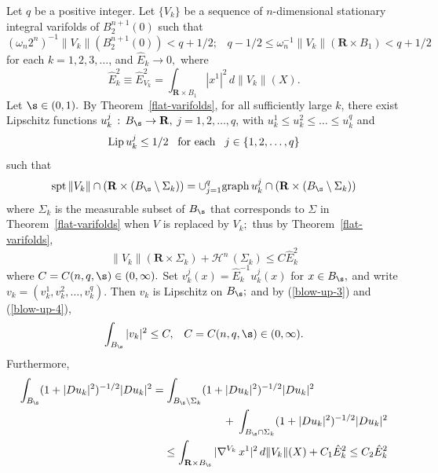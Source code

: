 \documentclass[a4paper,11pt]{amsart}
\begin{document}
Let $q$ be a positive integer. Let $\{V_{k}\}$ be a sequence of $n$-dimensional stationary integral varifolds of $B_{2}^{n+1}(0)$ such that 
\begin{equation}\label{blow-up-1}
(\omega_{n}2^{n})^{-1}\|V_{k}\|(B_{2}^{n+1}(0)) < q + 1/2; \;\;\; q-1/2 \leq \omega_{n}^{-1}\|V_{k}\|({\mathbf R} \times B_{1}) < q + 1/2
\end{equation}
for each $k=1, 2, 3, \ldots$, and ${\hat E}_{k} \to 0,$ where
\begin{equation}\label{blow-up-1-1}
{\hat E}_{k}^{2} \equiv {\hat E}_{V_{k}}^{2} = \int_{{\mathbf R} \times B_{1}} |x^{1}|^{2}\, d\|V_{k}\|(X).
\end{equation}
Let $\s \in (0, 1).$ By Theorem~\ref{flat-varifolds}, for all sufficiently large $k$, there exist Lipschitz functions 
$u_{k}^{j} \, : \, B_{\s} 
\to {\mathbf R},$ $j=1, 2, \ldots, q$, with $u_{k}^{1} \leq u_{k}^{2} \leq \ldots \leq u_{k}^{q}$ and 
\begin{equation}\label{blow-up-2}
{\rm Lip} \, u_{k}^{j} \leq 1/2 \;\;\; \mbox{for each} \;\;\;  j \in \{1, 2, \ldots, q\}
\end{equation}
such that 
\begin{equation}\label{blow-up-4}
{\rm spt} \, \|V_{k}\| \cap ({\mathbf R} \times (B_{\s} \setminus \Sigma_{k})) = 
\cup_{j=1}^{q} {\rm graph} \, u_{k}^{j} \cap ({\mathbf R} \times (B_{\s} \setminus \Sigma_{k}))
\end{equation}
where $\Sigma_{k}$ is the measurable subset of $B_{\s}$ that corresponds to $\Sigma$ in Theorem~\ref{flat-varifolds} 
when $V$ is replaced by $V_{k};$ thus by Theorem~\ref{flat-varifolds},  
\begin{equation}\label{blow-up-3}
\|V_{k}\|({\mathbf R} \times \Sigma_{k}) + {\mathcal H}^{n} \, (\Sigma_{k}) \leq C{\hat E}_{k}^{2}
\end{equation}
where $C  = C(n, q, \s) \in (0, \infty).$ Set 
$v_{k}^{j}(x) = {\hat E}_{k}^{-1}u_{k}^{j}(x)$ for $x \in B_{\s},$ and write $v_{k} = (v_{k}^{1}, v_{k}^{2}, \ldots, v_{k}^{q}).$ 
Then  $v_{k}$ is Lipschitz on $B_{\s};$ and by (\ref{blow-up-3}) and (\ref{blow-up-4}),
\begin{equation}\label{blow-up-5}
\int_{B_{\s}} |v_{k}|^{2} \leq C, \;\;\; C = C(n, q, \s) \in (0, \infty).
\end{equation} 
Furthermore, 
\begin{eqnarray*}
\int_{B_{\s}}(1 + |Du_{k}|^{2})^{-1/2} |Du_{k}|^{2} = \int_{B_{\s} \setminus \Sigma_{k}} (1 + |Du_{k}|^{2})^{-1/2}|Du_{k}|^{2}&&\nonumber\\ 
&&\hspace{-2in} + \; \int_{B_{\s} \cap \Sigma_{k}} (1 + |Du_{k}|^{2})^{-1/2}|Du_{k}|^{2}\nonumber\\
&&\hspace{-2in} \leq \int_{{\mathbf R} \times B_{\s}}  |\nabla^{V_{k}} \, x^{1}|^{2} \, d\|V_{k}\|(X) + C_{1}{\hat E}_{k}^{2} \leq C_{2}{\hat E}_{k}^{2}
\end{eqnarray*}
\end{document}
